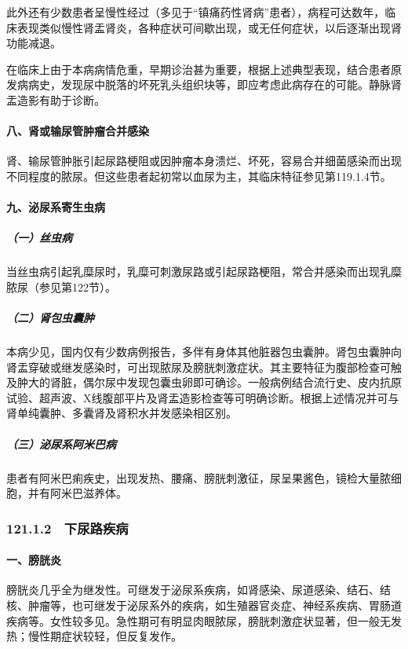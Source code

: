 此外还有少数患者呈慢性经过（多见于“镇痛药性肾病”患者），病程可达数年，临床表现类似慢性肾盂肾炎，各种症状可间歇出现，或无任何症状，以后逐渐出现肾功能减退。

在临床上由于本病病情危重，早期诊治甚为重要，根据上述典型表现，结合患者原发病病史，发现尿中脱落的坏死乳头组织块等，即应考虑此病存在的可能。静脉肾盂造影有助于诊断。

\paragraph{八、肾或输尿管肿瘤合并感染}

肾、输尿管肿胀引起尿路梗阻或因肿瘤本身溃烂、坏死，容易合并细菌感染而出现不同程度的脓尿。但这些患者起初常以血尿为主，其临床特征参见第119.1.4节。

\paragraph{九、泌尿系寄生虫病}

\subparagraph{（一）丝虫病}

当丝虫病引起乳糜尿时，乳糜可刺激尿路或引起尿路梗阻，常合并感染而出现乳糜脓尿（参见第122节）。

\subparagraph{（二）肾包虫囊肿}

本病少见，国内仅有少数病例报告，多伴有身体其他脏器包虫囊肿。肾包虫囊肿向肾盂穿破或继发感染时，可出现脓尿及膀胱刺激症状。其主要特征为腹部检查可触及肿大的肾脏，偶尔尿中发现包囊虫卵即可确诊。一般病例结合流行史、皮内抗原试验、超声波、X线腹部平片及肾盂造影检查等可明确诊断。根据上述情况并可与肾单纯囊肿、多囊肾及肾积水并发感染相区别。

\subparagraph{（三）泌尿系阿米巴病}

患者有阿米巴痢疾史，出现发热、腰痛、膀胱刺激征，尿呈果酱色，镜检大量脓细胞，并有阿米巴滋养体。

\subsubsection{121.1.2　下尿路疾病}

\paragraph{一、膀胱炎}

膀胱炎几乎全为继发性。可继发于泌尿系疾病，如肾感染、尿道感染、结石、结核、肿瘤等，也可继发于泌尿系外的疾病，如生殖器官炎症、神经系疾病、胃肠道疾病等。女性较多见。急性期可有明显肉眼脓尿，膀胱刺激症状显著，但一般无发热；慢性期症状较轻，但反复发作。


